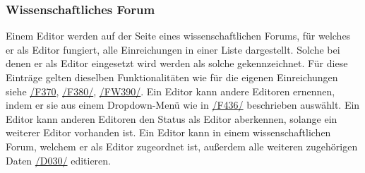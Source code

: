 \subsubsection{Wissenschaftliches Forum}\label{ed:wissFor}
\begin{description}
     Einem Editor werden auf der Seite eines wissenschaftlichen Forums, für
    welches er als Editor fungiert, alle Einreichungen in einer Liste dargestellt.
    Solche bei denen er als Editor eingesetzt wird werden als solche gekennzeichnet.
    Für diese Einträge gelten dieselben Funktionalitäten wie für die
    eigenen Einreichungen siehe \hyperref[funkt:370]{/F370}, \hyperref[funkt:380]{/F380/}, \hyperref[funkt:390]{/FW390/}.
     Ein Editor kann andere Editoren ernennen, indem er sie aus einem Dropdown-Menü
    wie in \hyperref[funkt:436]{/F436/} beschrieben auswählt.
     Ein Editor kann anderen Editoren den Status als Editor aberkennen,
    solange ein weiterer Editor vorhanden ist.
     Ein Editor kann in einem wissenschaftlichen Forum, welchem er als Editor zugeordnet ist,
    außerdem alle weiteren zugehörigen Daten \hyperref[d030]{/D030/} editieren.
\end{description}

